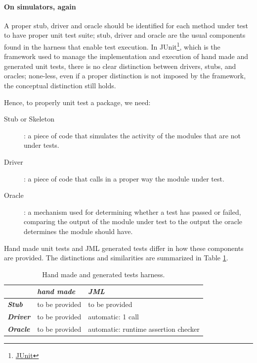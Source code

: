 \documentclass{article} \usepackage{times}
\newcommand{\myhref}[2]{\ifpdf\href{#1}{#2}\else\htmladdnormallinkfoot{#2}{#1}\fi}
\begin{document}
\paragraph*{On simulators, again}

A proper stub, driver and oracle should be identified for each method
under test to have proper unit test suite; stub, driver and oracle are
the usual components found in the harness that enable test
execution\cite{Binder1999}.  In
JUnit\footnote{\myhref{http://www.junit.org/}{JUnit}}, which is the
framework used to manage the implementation and execution of hand made
and generated unit tests, there is no clear distinction between
drivers, stubs, and oracles; none-less, even if a proper distinction
is not imposed by the framework, the conceptual distinction still
holds.

Hence, to properly unit test a package, we need:

\begin{description}
\item[Stub or Skeleton]: a piece of code that simulates the activity
  of the modules that are not under tests.
\item[Driver]: a piece of code that calls in a proper way the module
  under test.
\item[Oracle]: a mechanism used for determining whether a test has
  passed or failed, comparing the output of the module under test to
  the output the oracle determines the module should have.
\end{description}

Hand made unit tests and JML generated tests differ in how these
components are provided.  The distinctions and similarities are
summarized in Table \ref{tab:test_harness}.

\begin{table}[htbp]
  \caption{Hand made and generated tests harness.}
  \label{tab:test_harness}
  \begin{center}
    \begin{tabular}{|l|l|l|}\hline
      & \textbf{\textit{hand made}} & \textbf{\textit{JML}} \\\hline
      \textbf{\textit{Stub}} & to be provided & to be provided\\\hline
      \textbf{\textit{Driver}} & to be provided & automatic: 1 call\\\hline
      \textbf{\textit{Oracle}} & to be provided & 
      automatic: runtime assertion checker\\\hline
    \end{tabular}
  \end{center}
\end{table}
\end{document}
